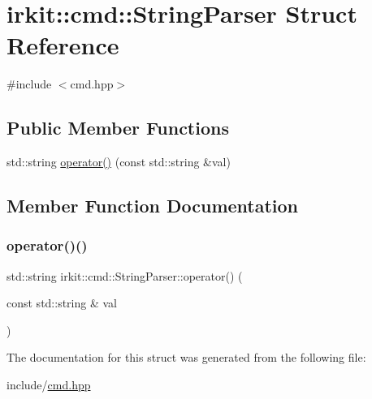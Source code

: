 \hypertarget{structirkit_1_1cmd_1_1StringParser}{}\section{irkit\+:\+:cmd\+:\+:String\+Parser Struct Reference}
\label{structirkit_1_1cmd_1_1StringParser}


{\ttfamily \#include $<$cmd.\+hpp$>$}

\subsection*{Public Member Functions}
\begin{DoxyCompactItemize}
\item 
std\+::string \mbox{\hyperlink{structirkit_1_1cmd_1_1StringParser_a5370cbb084e9d38a3be6ac5420030024}{operator()}} (const std\+::string \&val)
\end{DoxyCompactItemize}


\subsection{Member Function Documentation}
\mbox{\label{structirkit_1_1cmd_1_1StringParser_a5370cbb084e9d38a3be6ac5420030024}} 
\subsubsection{\texorpdfstring{operator()()}{operator()()}}
{\footnotesize\ttfamily std\+::string irkit\+::cmd\+::\+String\+Parser\+::operator() (\begin{DoxyParamCaption}\item[{const std\+::string \&}]{val }\end{DoxyParamCaption})\hspace{0.3cm}{\ttfamily [inline]}}



The documentation for this struct was generated from the following file\+:\begin{DoxyCompactItemize}
\item 
include/\mbox{\hyperlink{cmd_8hpp}{cmd.\+hpp}}\end{DoxyCompactItemize}
